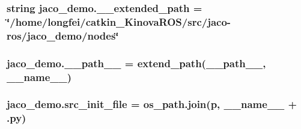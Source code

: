 \subsubsection[{\texorpdfstring{\+\_\+\+\_\+extended\+\_\+path}{__extended_path}}]{\setlength{\rightskip}{0pt plus 5cm}string jaco\+\_\+demo.\+\_\+\+\_\+extended\+\_\+path = \char`\"{}/home/longfei/catkin\+\_\+\+Kinova\+R\+OS/src/jaco-\/ros/jaco\+\_\+demo/nodes\char`\"{}\hspace{0.3cm}{\ttfamily [private]}}\hypertarget{namespacejaco__demo_af784247e9de42619c18a7e5d44c6b375}{}\label{namespacejaco__demo_af784247e9de42619c18a7e5d44c6b375}
\subsubsection[{\texorpdfstring{\+\_\+\+\_\+path\+\_\+\+\_\+}{__path__}}]{\setlength{\rightskip}{0pt plus 5cm}jaco\+\_\+demo.\+\_\+\+\_\+path\+\_\+\+\_\+ = extend\+\_\+path(\+\_\+\+\_\+path\+\_\+\+\_\+, \+\_\+\+\_\+name\+\_\+\+\_\+)\hspace{0.3cm}{\ttfamily [private]}}\hypertarget{namespacejaco__demo_a2905ccdea36f19d995e18224d6687ad8}{}\label{namespacejaco__demo_a2905ccdea36f19d995e18224d6687ad8}
\subsubsection[{\texorpdfstring{src\+\_\+init\+\_\+file}{src_init_file}}]{\setlength{\rightskip}{0pt plus 5cm}jaco\+\_\+demo.\+src\+\_\+init\+\_\+file = os\+\_\+path.\+join(p, \+\_\+\+\_\+name\+\_\+\+\_\+ + \textquotesingle{}.py\textquotesingle{})}\hypertarget{namespacejaco__demo_a3119f51bb1227df24870e8da520a08b8}{}\label{namespacejaco__demo_a3119f51bb1227df24870e8da520a08b8}
